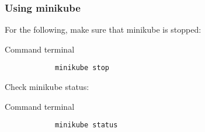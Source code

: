 \begin{frame}[fragile]
	\frametitle{Using minikube}
	
	For the following, make sure that minikube is stopped:
	\begin{block}{Command terminal}
		\begin{verbatim}
			minikube stop
		\end{verbatim}
	\end{block}
	
	Check minikube status:
	\begin{block}{Command terminal}
		\begin{verbatim}
			minikube status
		\end{verbatim}
	\end{block}
\end{frame}